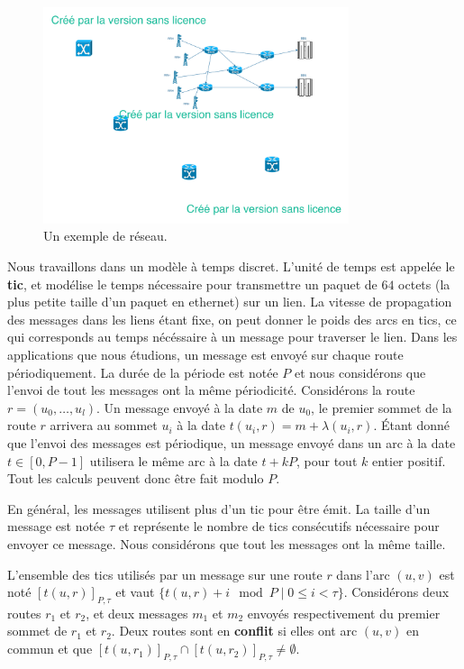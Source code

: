 \documentclass{article}
\begin{document}
   \begin{figure}
       \begin{center}
      \includegraphics[width = 0.8\textwidth]{reseau.pdf}
      \end{center}
      \caption{Un exemple de réseau.}
      \label{fig:res}   
     \end{figure}    

Nous travaillons dans un modèle à temps discret. L'unité de temps est appelée le {\bf tic}, et modélise le temps nécessaire pour transmettre un paquet de $64$ octets (la plus petite taille d'un paquet en ethernet) sur un lien. La vitesse de propagation des messages dans les liens étant fixe, on peut donner le poids des arcs en tics, ce qui corresponds au temps nécéssaire à un message pour traverser le lien.
Dans les applications que nous étudions, un message est envoyé sur chaque route périodiquement. La durée de la période est notée $P$ et nous considérons que l'envoi de tout les messages ont la même périodicité.
Considérons la route $r=(u_0,\dots,u_l)$. Un message envoyé à la date $m$ de $u_0$, le premier sommet de la route $r$ arrivera au sommet $u_i$ à la date $t(u_i,r) = m + \lambda(u_i,r)$. 
Étant donné que l'envoi des messages est périodique, un message envoyé dans un arc à la date $t\in [0,P-1]$ utilisera le même arc à la date $t+kP$, pour tout $k$ entier positif. Tout les calculs peuvent donc être fait modulo $P$.

En général, les messages utilisent plus d'un tic pour être émit. La taille d'un message est notée $\tau$ et représente le nombre de tics consécutifs nécessaire pour envoyer ce message. Nous considérons que tout les messages ont la même taille.

L'ensemble des tics utilisés par un message sur une route $r$ dans l'arc $(u,v)$ est noté $[t(u,r)]_{P,\tau}$ et vaut $ \{t(u,r) + i \mod P \mid 0 \leq i < \tau \}$.
Considérons deux routes $r_1$ et $r_2$, et deux messages $m_1$ et $m_2$ envoyés respectivement du premier sommet de $r_1$ et $r_2$. Deux routes sont en {\bf conflit} si elles ont arc $(u,v)$ en commun et que $[t(u,r_{1})]_{P,\tau} \cap [t(u,r_{2})]_{P,\tau} \neq \emptyset$.
      
\end{document}
